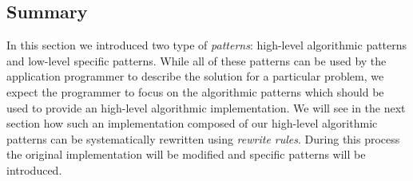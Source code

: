 \subsection{Summary}
In this section we introduced two type of \emph{patterns}:
high-level algorithmic patterns and low-level \OpenCL specific patterns.
While all of these patterns can be used by the application programmer to describe the solution for a particular problem, we expect the programmer to focus on the algorithmic patterns which should be used to provide an high-level algorithmic implementation.
We will see in the next section how such an implementation composed of our high-level algorithmic patterns can be systematically rewritten using \emph{rewrite rules}.
During this process the original implementation will be modified and \OpenCL specific patterns will be introduced.


